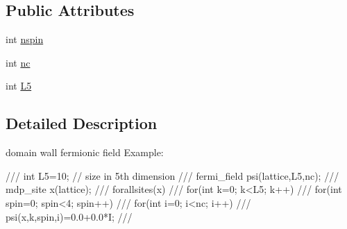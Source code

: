 \subsection*{Public Attributes}
\begin{DoxyCompactItemize}
\item 
int \hyperlink{classdwfermi__field_ac56aca6bd128b92467fdf7dca86535aa}{nspin}
\item 
int \hyperlink{classdwfermi__field_ab4c38d0b9f1016a5b121eced43a19370}{nc}
\item 
int \hyperlink{classdwfermi__field_a8bb8d2f33c7060b39da0563969b712a9}{L5}
\end{DoxyCompactItemize}


\subsection{Detailed Description}
domain wall fermionic field Example: \begin{DoxyVerb}
/// int L5=10; // size in 5th dimension 
/// fermi_field psi(lattice,L5,nc);
/// mdp_site x(lattice);
/// forallsites(x)
///    for(int k=0; k<L5; k++)
///      for(int spin=0; spin<4; spin++)
///        for(int i=0; i<nc; i++)
///          psi(x,k,spin,i)=0.0+0.0*I;
/// \end{DoxyVerb}
 


